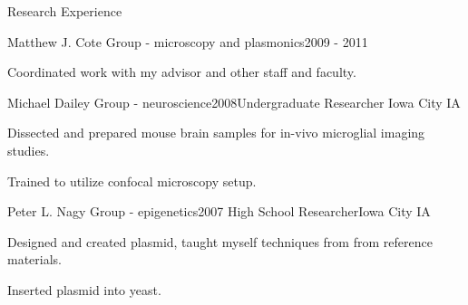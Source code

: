 \documentclass{resume}  %
\begin{document}
\begin{rSection}{Research Experience}
\begin{rSubsection}{Matthew J. Cote Group - microscopy and plasmonics}{2009 - 2011}
    \item Coordinated work with my advisor and other staff and faculty.
  \end{rSubsection}
  \begin{rSubsection}{Michael Dailey Group - neuroscience}{2008}{Undergraduate Researcher}
    {Iowa City IA}
    \item Dissected and prepared mouse brain samples for in-vivo microglial imaging studies.
    \item Trained to utilize confocal microscopy setup.
  \end{rSubsection}
  \begin{rSubsection}{Peter L. Nagy Group - epigenetics}{2007}
    {High School Researcher}{Iowa City IA}
    \item Designed and created plasmid, taught myself techniques from from reference materials.
    \item Inserted plasmid into yeast.
  \end{rSubsection}
\end{rSection}

\clearpage
\end{document}
